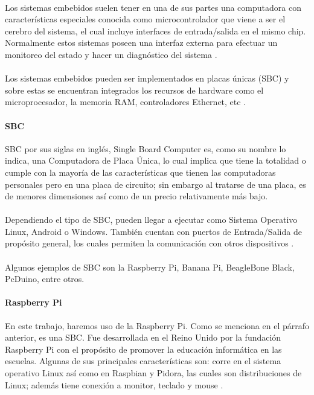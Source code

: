 \paragraph{}
Los sistemas embebidos suelen tener en una de sus partes una computadora con características especiales conocida como microcontrolador que viene a ser el cerebro del sistema, el cual incluye interfaces de entrada/salida en el mismo chip. Normalmente estos sistemas poseen una interfaz externa para efectuar un monitoreo del estado y hacer un diagnóstico del sistema \citep{MarcoTeorico15}.
\paragraph{}
Los sistemas embebidos pueden ser implementados en placas únicas (SBC) y sobre estas se encuentran integrados los recursos de hardware como el microprocesador, la memoria RAM, controladores Ethernet, etc \citep{MarcoTeorico14}.
\paragraph{SBC}
SBC por sus siglas en inglés, Single Board Computer es, como su nombre lo indica, una Computadora de Placa Única, lo cual implica que tiene la totalidad o cumple con la mayoría de las características que tienen las computadoras personales pero en una placa de circuito; sin embargo al tratarse de una placa, es de menores dimensiones así como de un precio relativamente más bajo.
\paragraph{}
Dependiendo el tipo de SBC, pueden llegar a ejecutar como Sistema Operativo Linux, Android o Windows. También cuentan con puertos de Entrada/Salida de propósito general, los cuales permiten la comunicación con otros dispositivos \citep{MarcoTeorico18}. 
\paragraph{}
Algunos ejemplos de SBC son la Raspberry Pi, Banana Pi, BeagleBone Black, PcDuino, entre otros.
\paragraph{Raspberry Pi}
En este trabajo, haremos uso de la Raspberry Pi. Como se menciona en el párrafo anterior, es una SBC. Fue desarrollada en el Reino Unido por la fundación Raspberry Pi con el propósito de promover la educación informática en las escuelas. Algunas de sus principales características son: corre en el sistema operativo Linux así como en Raspbian y Pidora, las cuales son distribuciones de Linux; además tiene conexión a monitor, teclado y mouse \citep{MarcoTeorico19}.   

